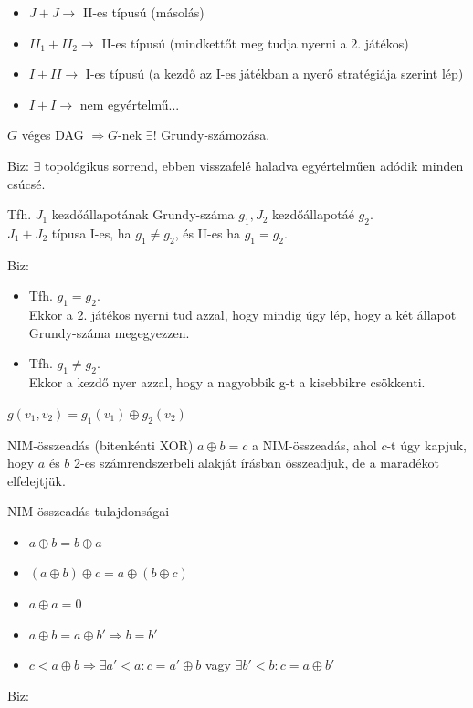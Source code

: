 	\begin{observation}{}{}
		\begin{itemize}
			\item $J + J\rightarrow$ II-es típusú (másolás)
			\item $II_1 + II_2\rightarrow$ II-es típusú (mindkettőt meg tudja nyerni a 2. játékos)
			\item $I + II\rightarrow$ I-es típusú (a kezdő az I-es játékban a nyerő stratégiája szerint lép)
			\item $I + I\rightarrow$ nem egyértelmű...
		\end{itemize}
	\end{observation}
	
	\begin{statement}{}{}
		$G$ véges DAG $\Rightarrow G$-nek $\exists$! Grundy-számozása.
	\end{statement}
	Biz: $\exists$ topológikus sorrend, ebben visszafelé haladva egyértelműen adódik minden csúcsé.
	
	\begin{statement}{}{}
		Tfh. $J_1$ kezdőállapotának Grundy-száma $g_1, J_2$ kezdőállapotáé $g_2$. \\
		$J_1 + J_2$ típusa I-es, ha $g_1 \not= g_2$, és II-es ha $g_1 = g_2$.
	\end{statement}
	Biz: 
	\begin{itemize}
		\item Tfh. $g_1=g_2$. \\
		Ekkor a 2. játékos nyerni tud azzal, hogy mindig úgy lép, hogy a két állapot Grundy-száma megegyezzen.
		\item Tfh. $g_1 \not= g_2$.  \\
		Ekkor a kezdő nyer azzal, hogy a nagyobbik g-t a kisebbikre csökkenti.
	\end{itemize}
	
	
	\begin{theorem}{}{}
		$g(v_1,v_2) = g_1(v_1)\oplus g_2(v_2)$
	\end{theorem}
	
	\begin{definition}{NIM-összeadás (bitenkénti XOR)}{}
		$a \oplus b = c$ a NIM-összeadás, ahol $c$-t úgy kapjuk, hogy $a$ és $b$ 2-es számrendszerbeli alakját írásban összeadjuk, de a maradékot elfelejtjük. 
	\end{definition}
	
	\begin{observation}{NIM-összeadás tulajdonságai}{}
		\begin{itemize}
			\item $a\oplus b = b\oplus a$
			\item $(a \oplus b ) \oplus c = a \oplus (b \oplus c)$
			\item $a \oplus a = 0$
			\item $a \oplus b = a \oplus b'\Rightarrow b=b'$
			\item $c < a \oplus b \Rightarrow \exists a' < a: c =a' \oplus b$ vagy $\exists b' < b: c =a \oplus b'$
		\end{itemize}
	\end{observation}
	Biz: \\
	
